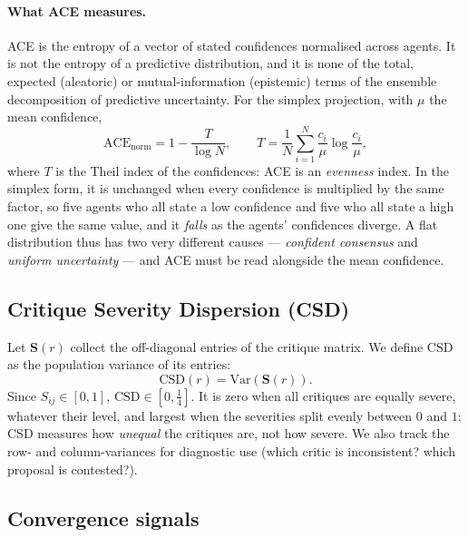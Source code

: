 \documentclass[10pt,a4paper]{article}
\begin{document}
\paragraph{What ACE measures.} ACE is the entropy of a vector of stated
confidences normalised across agents. It is not the entropy of a predictive
distribution, and it is none of the total, expected (aleatoric) or
mutual-information (epistemic) terms of the ensemble decomposition of predictive
uncertainty. For the simplex projection, with $\mu$ the mean confidence,
\begin{equation}
  \mathrm{ACE}_{\mathrm{norm}} = 1 - \frac{T}{\log N},\qquad
  T = \frac{1}{N}\sum_{i=1}^{N} \frac{c_i}{\mu}\log\frac{c_i}{\mu},
\end{equation}
where $T$ is the Theil index of the confidences: ACE is an \emph{evenness} index.
In the simplex form, it is unchanged when every confidence is multiplied by the same factor, so five
agents who all state a low confidence and five who all state a high one give the
same value, and it \emph{falls}
as the agents' confidences diverge. A flat distribution thus has two very
different causes --- \emph{confident consensus} and \emph{uniform uncertainty}
--- and ACE must be read alongside the mean confidence.

\subsection{Critique Severity Dispersion (CSD)}

Let $\mathbf{S}(r)$ collect the off-diagonal entries of the critique matrix.
We define CSD as the population variance of its entries:
\begin{equation}
  \mathrm{CSD}(r) = \mathrm{Var}\left(\mathbf{S}(r)\right).
\end{equation}
Since $S_{ij}\in[0,1]$, $\mathrm{CSD}\in[0,\tfrac14]$. It is zero when all critiques
are equally severe, whatever their level, and largest when the severities split
evenly between $0$ and $1$: CSD measures how \emph{unequal} the critiques are, not
how severe. We also track the row- and column-variances
for diagnostic use (which critic is inconsistent? which proposal is contested?).

\subsection{Convergence signals}
\end{document}
